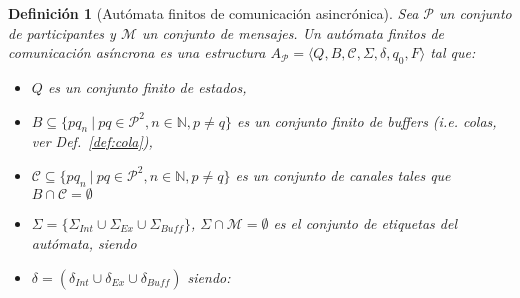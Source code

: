 \documentclass[paper=a4, fontsize=11pt, spanish]{scrartcl} %
\numberwithin{equation}{section} %
\numberwithin{figure}{section} %
\numberwithin{table}{section} %
\newtheorem{definition}{Definición}
\begin{document}
\begin{definition}[Autómata finitos de comunicación asincrónica]
\label{def:aa}
Sea $\mathcal{P}$ un conjunto de participantes y $\mathcal{M}$ un conjunto de mensajes. Un \emph{autómata finitos de comunicación asíncrona} es una estructura $A_\mathcal{P} = \langle Q, B, \mathcal{C}, \Sigma, \delta, q_0, F\rangle$ tal que:

\begin{itemize}
\item $Q$ es un conjunto finito de estados,
\item $B \subseteq \{pq_n \ | \ pq \in \mathcal{P}^2, n \in \mathbb{N}, p \neq q \} $ es un conjunto finito de buffers (i.e. colas, ver Def.~\ref{def:cola}),
\item $\mathcal{C} \subseteq \{pq_n \ | \ pq \in \mathcal{P}^2, n \in \mathbb{N}, p \neq q \}$ es un conjunto de canales tales que $B \cap \mathcal{C} = \emptyset$ 
\item $\Sigma = \{ \Sigma_\mathit{Int} \cup \Sigma_\mathit{Ex} \cup \Sigma_\mathit{Buff}\} $, $\Sigma \cap \mathcal{M} = \emptyset$ es el conjunto de etiquetas del autómata, siendo
\item $\delta = (\delta_\mathit{Int} \cup \delta_\mathit{Ex} \cup \delta_\mathit{Buff})$ siendo:

\end{itemize}
\end{definition}
\end{document}
